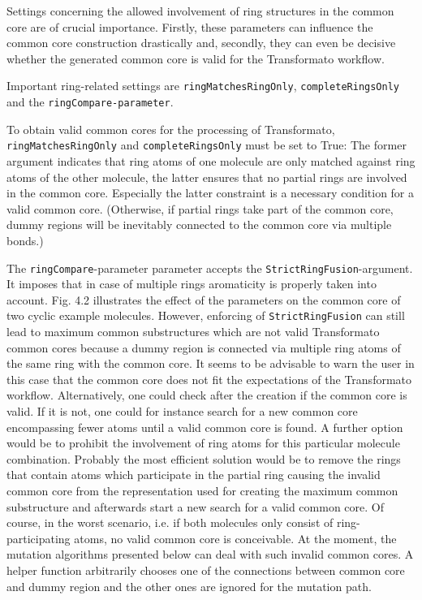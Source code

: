 Settings concerning the allowed involvement of ring structures in
the common core are of crucial importance. Firstly, these parameters
can influence the common core construction drastically and, secondly, they
can even be decisive whether the generated common core is valid for the
Transformato workflow.

Important ring-related settings are \texttt{ringMatchesRingOnly}, \texttt{completeRingsOnly}
and the \texttt{ringCompare-parameter}. 

To obtain valid common cores for the processing of Transformato, \texttt{ringMatchesRingOnly}
and \texttt{completeRingsOnly} must be set to True: The former argument indicates
that ring atoms of one molecule are only matched against ring atoms
of the other molecule, the latter ensures that no partial rings are
involved in the common core. Especially the latter constraint is a
necessary condition for a valid common core. (Otherwise, if partial
rings take part of the common core, dummy regions will be inevitably
connected to the common core via multiple bonds.)

The \texttt{ringCompare}-parameter parameter accepts the \texttt{StrictRingFusion}-argument.
It imposes that in case of multiple rings aromaticity is properly
taken into account. Fig. 4.2 illustrates the effect of the parameters
on the common core of two cyclic example molecules. However, enforcing
of \texttt{StrictRingFusion} can still lead to maximum common substructures
which are not valid Transformato common cores because a dummy region
is connected via multiple ring atoms of the same ring with the common
core. It seems to be advisable to warn the user in this case that the common
core does not fit the expectations of the Transformato workflow. Alternatively,
one could check after the creation if the common core is valid. If
it is not, one could for instance search for a new common core encompassing fewer
atoms until a valid common core is found. A further option would be to prohibit the involvement of ring atoms for this particular molecule combination.
Probably the most efficient solution would be to remove the rings that contain atoms which participate in the partial ring causing the invalid common core from the representation used for creating the maximum common substructure and afterwards start a new search for a valid common core.
Of course,
in the worst scenario, i.e. if both molecules only consist of ring-participating
atoms, no valid common core is conceivable.
At the moment, the mutation algorithms presented below can deal with such invalid common cores. A helper function arbitrarily chooses one of the connections between common core and dummy region and the other ones are ignored for the mutation path.


